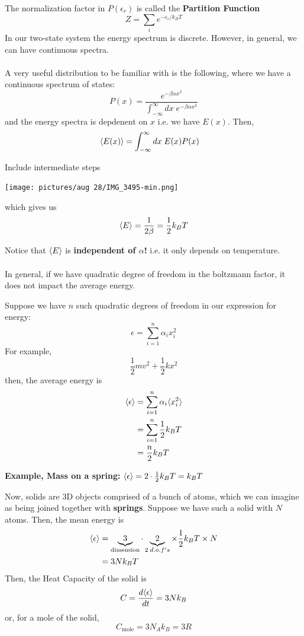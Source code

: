 \documentclass[11pt]{article}
\begin{document}
The normalization factor in $P(\epsilon_r)$ is called the \textbf{Partition Function}
\[ Z = \sum_{i} e^{-\epsilon_i / k_B T} \] In our two-state system the energy spectrum is discrete. However, in general, we can have continuous spectra.
\\
\\
A very useful distribution to be familiar with is the following, where we have a continuous spectrum of states:
\[ P(x) = \frac{e^{-\beta \alpha x^2}}{\int_{-\infty}^{\infty} dx\; e^{-\beta \alpha x^2} } \]
and  the energy spectra is depdenent on $x$ i.e. we have $E(x)$. Then,
\begin{align*}
  \langle E(x) \rangle &= \int_{-\infty}^{\infty} dx\; E(x) P(x)
\end{align*}
\begin{note}
  {Include intermediate steps}
\end{note}
\begin{center}
  \texttt{[image: pictures/aug 28/IMG\_3495-min.png]}
\end{center}

which gives us 
\[ \langle E \rangle = \frac{1}{2\beta} = \frac{1}{2} k_B T \]

\begin{bluebox}
  Notice that $\langle E \rangle$ is \textbf{independent of $\alpha$!} i.e. it only depends on temperature. 
  \\
  \\
  In general, if we have quadratic degree of freedom in the boltzmann factor, it does not impact the average energy.
\end{bluebox}

Suppose we have $n$ such quadratic degrees of freedom in our expression for energy: 
\[ \epsilon = \sum_{i = 1}^{n} \alpha_i x_i^2 \] 
For example,
\[ \frac{1}{2} mv^2 + \frac{1}{2} kx^2 \]
then, the average energy is 
\begin{align*}
  \langle \epsilon \rangle &=  \sum_{i = 1}^{n} \alpha_i \langle x_i^2 \rangle \\
  &= \sum_{i = 1}^{n} \frac{1}{2} k_B T \\
  &= \frac{n}{2} k_B T
\end{align*}

\begin{redbox}
  \textbf{Example, Mass on a spring:} $\langle \epsilon \rangle = 2 \cdot \frac{1}{2} k_B T = k_B T $ 
\end{redbox}

Now, solids are 3D objects comprised of a bunch of atoms, which we can imagine as being joined together with \textbf{springs}. Suppose we have such a solid with $N$ atoms. Then, the mean energy is 
\begin{align*}
  \langle \epsilon \rangle &= \underbrace{3}_{\text{dimension}} \cdot \underbrace{2}_{2 \; d.o.f's} \times \frac{1}{2} k_B T \times N \\
  &= 3N k_B T
\end{align*}
Then, the Heat Capacity of the solid is 
\begin{align*}
  C = \frac{d\langle \epsilon \rangle}{dt} = 3Nk_B
\end{align*}
or, for a mole of the solid, 
\[ C_{\text{mole}} = 3 N_A k_B = 3 R \]
\end{document}
